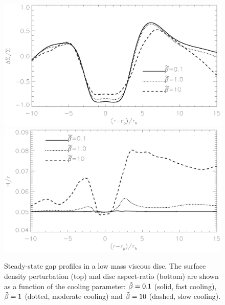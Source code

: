 \begin{figure}
  \includegraphics[scale=.42,clip=true,trim=0cm 1.8cm 0cm 0cm]{figures/compare_profiles_dens020.ps}\\
  \includegraphics[scale=.42]{figures/compare_profiles_h020.ps}
  \caption{Steady-state gap profiles in a low mass viscous disc. The
    surface density perturbation (top) and disc aspect-ratio (bottom)
    are shown as a function of the cooling parameter:  
    $\tilde{\beta}=0.1$ (solid, fast cooling), $\tilde{\beta}=1$ (dotted,
    moderate cooling) and $\tilde{\beta}=10$ (dashed, slow
    cooling). \label{lvisc_steady_gap}}  
\end{figure}



